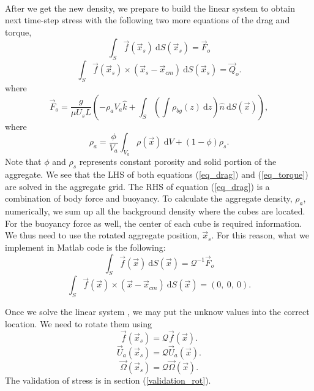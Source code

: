 \\
After we get the new density, we prepare to build the linear system to obtain next time-step stress with the following two more equations of the drag and torque,
\begin{equation}
\int_{S} \vec{f}(\vec{x}_s) \  \text{d}S(\vec{x}_s)
= \vec{F}_o
 \label{eq_drag}
 \end{equation} 
 \begin{equation}
 	\int_S \vec{f} (\vec{x}_s)  \times (\vec{x}_s - \vec{x}_{cm}) \ \textrm{d}S(\vec{x}_s) = \vec{Q}_o.
 \label{eq_torque}
 \end{equation}
 where 
  \begin{equation}
	  \vec{F}_o = 
 \frac{g}{\mu U_s L}
	\left( 
	- \rho_a V_a \hat{k}
	+ \int_{S} \left( 
	   \int  {\rho}_{bg}(z) \ \textrm{d}z
	 \right) 
	\hat{n} \ \textrm{d}S (\vec{x})
	\right),
	 \label{eq_Fo_2}
\end{equation}
where 
\[
\rho_a = \frac{\phi}{V_a}\int_{V_a} \rho(\vec{x}) \ \text{d}V
+ (1-\phi)\rho_s.
\]
Note that $\phi$ and $\rho_s$ represents constant porosity and 
solid portion of the aggregate.
We see that the LHS of both equations (\ref{eq_drag}) 
and (\ref{eq_torque}) are solved in the aggregate grid. 
The RHS of equation (\ref{eq_drag}) is a combination of body force and buoyancy.
To calculate the aggregate density, $\rho_a$, numerically, 
we sum up all the background density where the cubes are located. 
For the buoyancy force as well, the center of each cube is required information.
We thus need to use the rotated aggregate position, $\vec{x}_s$.  
For this reason, what we implement in Matlab code is the following:
\begin{equation}
	\int_{S} \vec{f}(\vec{x}) \  \text{d}S(\vec{x})
	= \mathcal{Q}^{-1} \vec{F}_o
	 \label{eq_drag_code}
	 \end{equation} 
	 \begin{equation}
		 \int_S \vec{f} (\vec{x})  \times (\vec{x} - \vec{x}_{cm}) 
		 \ \textrm{d}S(\vec{x}) 
		 = (0,\ 0, \ 0).
	 \label{eq_torque_code}
	 \end{equation}
\par
Once we solve the linear system ,
 we may put the unknow values into the correct location.
We need to rotate them using
\[
\vec{f}(\vec{x}_s) = \mathcal{Q} \vec{f}(\vec{x}).	
\]
\[
\vec{U}_a (\vec{x}_s) = \mathcal{Q} \vec{U}_a (\vec{x}).	
\]
\[
\vec{\Omega}(\vec{x}_s) = \mathcal{Q} \vec{\Omega}(\vec{x}).	
\]
The validation of stress is in section (\ref{validation_rot}).


